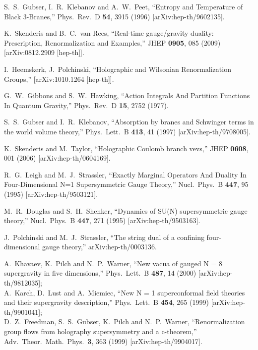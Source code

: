 \documentclass[12pt]{article}
\begin{document}
{\begin{thebibliography}{99}
  S.~S.~Gubser, I.~R.~Klebanov and A.~W.~Peet,
  ``Entropy and Temperature of Black 3-Branes,''
  Phys.\ Rev.\  D {\bf 54}, 3915 (1996)
  [arXiv:hep-th/9602135].
  
  K.~Skenderis and B.~C.~van Rees,
  ``Real-time gauge/gravity duality: Prescription, Renormalization and
  Examples,''
  JHEP {\bf 0905}, 085 (2009)
  [arXiv:0812.2909 [hep-th]].
  
  I.~Heemskerk, J.~Polchinski,
  ``Holographic and Wilsonian Renormalization Groups,''
  [arXiv:1010.1264 [hep-th]].
  
  G.~W.~Gibbons and S.~W.~Hawking,
  ``Action Integrals And Partition Functions In Quantum Gravity,''
  Phys.\ Rev.\  D {\bf 15}, 2752 (1977).

  
  S.~S.~Gubser and I.~R.~Klebanov,
  ``Absorption by branes and Schwinger terms in the world volume theory,''
  Phys.\ Lett.\  B {\bf 413}, 41 (1997)
  [arXiv:hep-th/9708005].
  
  K.~Skenderis and M.~Taylor,
  ``Holographic Coulomb branch vevs,''
  JHEP {\bf 0608}, 001 (2006)
  [arXiv:hep-th/0604169].
  
  R.~G.~Leigh and M.~J.~Strassler,
  ``Exactly Marginal Operators And Duality In Four-Dimensional N=1
  Supersymmetric Gauge Theory,''
  Nucl.\ Phys.\  B {\bf 447}, 95 (1995)
  [arXiv:hep-th/9503121].
  
  M.~R.~Douglas and S.~H.~Shenker,
  ``Dynamics of SU(N) supersymmetric gauge theory,''
  Nucl.\ Phys.\  B {\bf 447}, 271 (1995)
  [arXiv:hep-th/9503163].
  
  J.~Polchinski and M.~J.~Strassler,
  ``The string dual of a confining four-dimensional gauge theory,''
  arXiv:hep-th/0003136.
  
  A.~Khavaev, K.~Pilch and N.~P.~Warner,
  ``New vacua of gauged N = 8 supergravity in five dimensions,''
  Phys.\ Lett.\  B {\bf 487}, 14 (2000)
  [arXiv:hep-th/9812035];\\
  A.~Karch, D.~Lust and A.~Miemiec,
  ``New N = 1 superconformal field theories and their supergravity
  description,''
  Phys.\ Lett.\  B {\bf 454}, 265 (1999)
  [arXiv:hep-th/9901041];\\
  D.~Z.~Freedman, S.~S.~Gubser, K.~Pilch and N.~P.~Warner,
  ``Renormalization group flows from holography supersymmetry and a
  c-theorem,''
  Adv.\ Theor.\ Math.\ Phys.\  {\bf 3}, 363 (1999)
  [arXiv:hep-th/9904017].
  

\end{thebibliography}}
\end{document}
